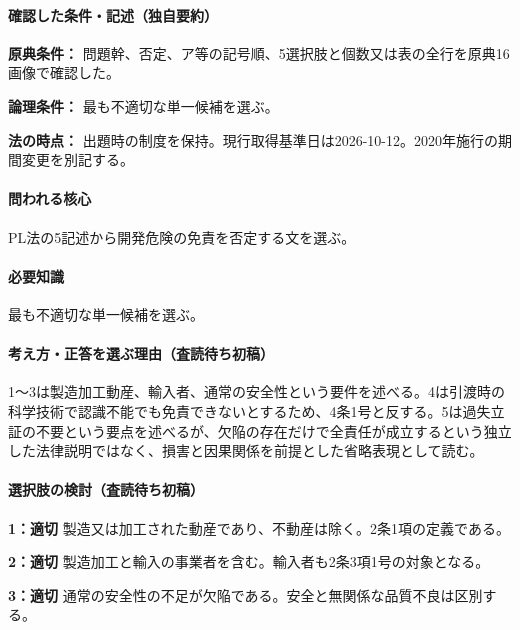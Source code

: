 \paragraph{確認した条件・記述（独自要約）}\mbox{}\par

\noindent\textbf{原典条件：} 問題幹、否定、ア等の記号順、5選択肢と個数又は表の全行を原典16画像で確認した。\par

\noindent\textbf{論理条件：} 最も不適切な単一候補を選ぶ。\par

\noindent\textbf{法の時点：} 出題時の制度を保持。現行取得基準日は2026-10-12。2020年施行の期間変更を別記する。\par

\paragraph{問われる核心} PL法の5記述から開発危険の免責を否定する文を選ぶ。

\paragraph{必要知識} 最も不適切な単一候補を選ぶ。

\paragraph{考え方・正答を選ぶ理由（査読待ち初稿）} 1〜3は製造加工動産、輸入者、通常の安全性という要件を述べる。4は引渡時の科学技術で認識不能でも免責できないとするため、4条1号と反する。5は過失立証の不要という要点を述べるが、欠陥の存在だけで全責任が成立するという独立した法律説明ではなく、損害と因果関係を前提とした省略表現として読む。

\paragraph{選択肢の検討（査読待ち初稿）}\mbox{}\par

\noindent\textbf{1：適切} 製造又は加工された動産であり、不動産は除く。2条1項の定義である。\par

\noindent\textbf{2：適切} 製造加工と輸入の事業者を含む。輸入者も2条3項1号の対象となる。\par

\noindent\textbf{3：適切} 通常の安全性の不足が欠陥である。安全と無関係な品質不良は区別する。\par

